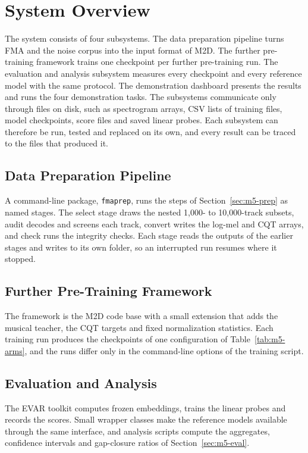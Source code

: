 \documentclass{FastFyp}
\begin{document}
\section{System Overview}
\label{sec:des-overview}
The system consists of four subsystems. The data preparation pipeline turns FMA and the noise corpus into the input format of M2D. The further pre-training framework trains one checkpoint per further pre-training run. The evaluation and analysis subsystem measures every checkpoint and every reference model with the same protocol. The demonstration dashboard presents the results and runs the four demonstration tasks. The subsystems communicate only through files on disk, such as spectrogram arrays, CSV lists of training files, model checkpoints, score files and saved linear probes. Each subsystem can therefore be run, tested and replaced on its own, and every result can be traced to the files that produced it.

\subsection{Data Preparation Pipeline}
A command-line package, \texttt{fmaprep}, runs the steps of Section~\ref{sec:m5-prep} as named stages. The select stage draws the nested 1,000- to 10,000-track subsets, audit decodes and screens each track, convert writes the log-mel and CQT arrays, and check runs the integrity checks. Each stage reads the outputs of the earlier stages and writes to its own folder, so an interrupted run resumes where it stopped.

\subsection{Further Pre-Training Framework}
The framework is the M2D code base with a small extension that adds the musical teacher, the CQT targets and fixed normalization statistics. Each training run produces the checkpoints of one configuration of Table~\ref{tab:m5-arms}, and the runs differ only in the command-line options of the training script.

\subsection{Evaluation and Analysis}
The EVAR toolkit computes frozen embeddings, trains the linear probes and records the scores. Small wrapper classes make the reference models available through the same interface, and analysis scripts compute the aggregates, confidence intervals and gap-closure ratios of Section~\ref{sec:m5-eval}.
\end{document}
